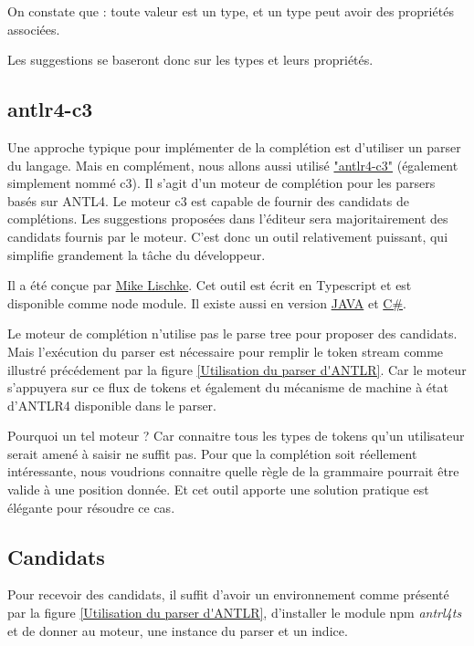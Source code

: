 \documentclass[
    iict, %
    il, %
]{heig-tb}
\begin{document}
On constate que : toute valeur est un type, et un type peut avoir des propriétés associées.

Les suggestions se baseront donc sur les types et leurs propriétés.

\subsection{antlr4-c3}

Une approche typique pour implémenter de la complétion est d'utiliser un parser du langage.
Mais en complément, nous allons aussi utilisé \href{https://github.com/mike-lischke/antlr4-c3}{"antlr4-c3"} (également simplement nommé c3).
Il s'agit d'un moteur de complétion pour les parsers basés sur ANTL4. Le moteur c3 est capable de fournir des candidats de complétions.
Les suggestions proposées dans l'éditeur sera majoritairement des candidats fournis par le moteur. C'est donc un outil relativement puissant, qui simplifie grandement la tâche du développeur.

Il a été conçue par \href{https://github.com/mike-lischke}{Mike Lischke}. Cet outil est écrit en Typescript et est disponible comme node module. Il existe aussi en version \href{https://github.com/mike-lischke/antlr4-c3/tree/master/ports/java}{JAVA} et \href{https://github.com/mike-lischke/antlr4-c3/tree/master/ports/c%23}{C\#}.

Le moteur de complétion n'utilise pas le parse tree pour proposer des candidats. Mais l'exécution du parser est nécessaire pour remplir le token stream comme illustré précédement par la figure \ref{Utilisation du parser d'ANTLR}.
Car le moteur s'appuyera sur ce flux de tokens et également du mécanisme de machine à état d'ANTLR4 disponible dans le parser. \cite{antlr-mega-tutorial}

Pourquoi un tel moteur ?
Car connaitre tous les types de tokens qu'un utilisateur serait amené à saisir ne suffit pas. Pour que la complétion soit réellement intéressante, nous voudrions connaitre quelle règle de la grammaire pourrait être valide à une position donnée.
Et cet outil apporte une solution pratique est élégante pour résoudre ce cas.

\subsection{Candidats}\label{candidates}

Pour recevoir des candidats, il suffit d'avoir un environnement comme présenté par la figure \ref{Utilisation du parser d'ANTLR}, d'installer le module npm \emph{antrl4ts} et
de donner au moteur, une instance du parser et un indice.
\end{document}
